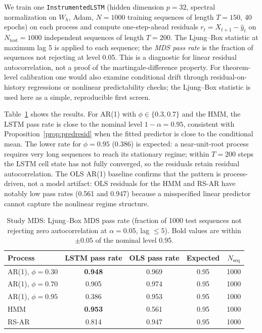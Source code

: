 \documentclass[bj,authoryear]{imsart}
\theoremstyle{plain}
\theoremstyle{definition}
\begin{document}
We train one \texttt{InstrumentedLSTM} (hidden dimension $p=32$, spectral
normalization on $W_h$, Adam, $N=1000$ training sequences of length $T=150$,
40 epochs) on each process and compute one-step-ahead residuals
$r_t = X_{t+1} - \hat{y}_t$ on $N_\text{test} = 1000$ independent sequences
of length $T = 200$.  The Ljung--Box statistic \citep{ljung1978measure} at
maximum lag 5 is applied to each sequence; the \emph{MDS pass rate} is the
fraction of sequences not rejecting at level 0.05.  This is a diagnostic for
linear residual autocorrelation, not a proof of the martingale-difference
property.  For theorem-level calibration one would also examine conditional
drift through residual-on-history regressions or nonlinear predictability
checks; the Ljung--Box statistic is used here as a simple, reproducible
first screen.

Table~\ref{tab:mds} shows the results.
For AR(1) with $\phi \in \{0.3, 0.7\}$ and the HMM, the LSTM pass rate is
close to the nominal level $1-\alpha = 0.95$, consistent with
Proposition~\ref{prop:predresid} when the fitted predictor is close to the
conditional mean.
The lower rate for $\phi = 0.95$ (0.386) is expected: a near-unit-root
process requires very long sequences to reach its stationary regime; within
$T = 200$ steps the LSTM cell state has not fully converged, so the residuals
retain residual autocorrelation.
The OLS AR(1) baseline confirms that the pattern is process-driven, not a
model artifact: OLS residuals for the HMM and RS-AR have notably low pass
rates (0.561 and 0.947) because a misspecified linear predictor cannot capture
the nonlinear regime structure.

\begin{table}[ht]
\centering
\caption{Study MDS: Ljung--Box MDS pass rate (fraction of 1000 test sequences
  not rejecting zero autocorrelation at $\alpha = 0.05$, lag $\leq 5$).
  Bold values are within $\pm 0.05$ of the nominal level 0.95.}
\label{tab:mds}
\begin{tabular}{lcccc}
\toprule
Process & LSTM pass rate & OLS pass rate & Expected & $N_\text{seq}$ \\
\midrule
AR(1), $\phi = 0.30$ & \textbf{0.948} & 0.969 & 0.95 & 1000 \\
AR(1), $\phi = 0.70$ & 0.905          & 0.974 & 0.95 & 1000 \\
AR(1), $\phi = 0.95$ & 0.386          & 0.953 & 0.95 & 1000 \\
HMM                  & \textbf{0.953} & 0.561 & 0.95 & 1000 \\
RS-AR                & 0.814          & 0.947 & 0.95 & 1000 \\
\bottomrule
\end{tabular}
\end{table}
\end{document}
